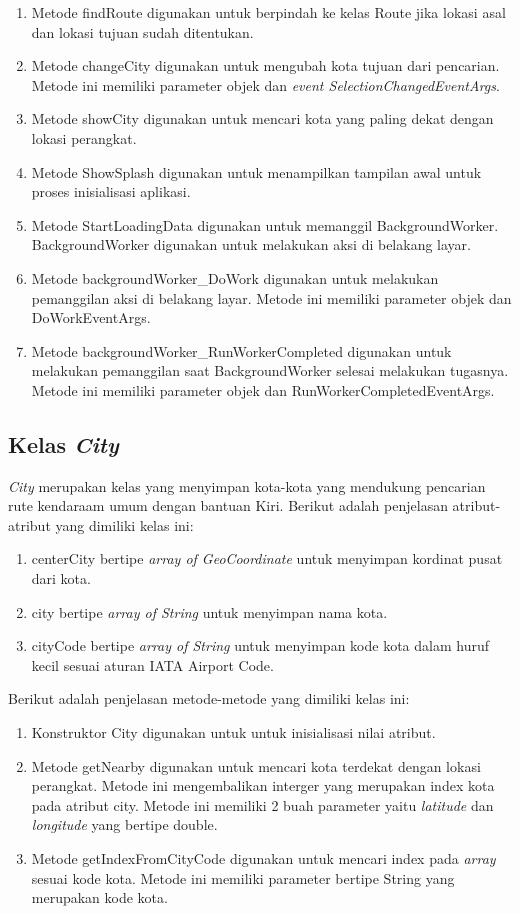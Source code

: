 \begin{enumerate}
	\item Metode findRoute digunakan untuk berpindah ke kelas Route jika lokasi asal dan lokasi tujuan sudah ditentukan.
	\item Metode changeCity digunakan untuk mengubah kota tujuan dari pencarian. Metode ini memiliki parameter objek dan \textit{event SelectionChangedEventArgs}.
	\item Metode showCity digunakan untuk mencari kota yang paling dekat dengan lokasi perangkat.
	\item Metode ShowSplash digunakan untuk menampilkan tampilan awal untuk proses inisialisasi aplikasi.
	\item Metode StartLoadingData digunakan untuk memanggil BackgroundWorker. BackgroundWorker digunakan untuk melakukan aksi di belakang layar.
	\item Metode backgroundWorker\_DoWork digunakan untuk melakukan pemanggilan aksi di belakang layar. Metode ini memiliki parameter objek dan DoWorkEventArgs.
	\item Metode backgroundWorker\_RunWorkerCompleted digunakan untuk melakukan pemanggilan saat BackgroundWorker selesai melakukan tugasnya. Metode ini memiliki parameter objek dan RunWorkerCompletedEventArgs.
\end{enumerate}

\subsection{Kelas \textit{City}}
\label{lab:Kelas City}
\hspace{0.5cm} \textit{City} merupakan kelas yang menyimpan kota-kota yang mendukung pencarian rute kendaraam umum dengan bantuan Kiri. Berikut adalah penjelasan atribut-atribut yang dimiliki kelas ini:
\begin{enumerate}
	\item centerCity bertipe \textit{array of GeoCoordinate} untuk menyimpan kordinat pusat dari kota.
	\item city bertipe \textit{array of String} untuk menyimpan nama kota.
	\item cityCode bertipe \textit{array of String} untuk menyimpan kode kota dalam huruf kecil sesuai aturan IATA Airport Code. 
\end{enumerate}

Berikut adalah penjelasan metode-metode yang dimiliki kelas ini:
\begin{enumerate}
	\item Konstruktor City digunakan untuk untuk inisialisasi nilai atribut.
	\item Metode getNearby digunakan untuk mencari kota terdekat dengan lokasi perangkat. Metode ini mengembalikan interger yang merupakan index kota pada atribut city. Metode ini memiliki 2 buah parameter yaitu \textit{latitude} dan \textit{longitude} yang bertipe double.
	\item Metode getIndexFromCityCode digunakan untuk mencari index pada \textit{array}  sesuai kode kota. Metode ini memiliki parameter bertipe String yang merupakan kode kota.
\end{enumerate}

